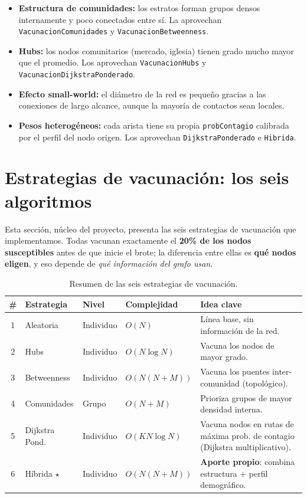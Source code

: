 \documentclass[spanish,notitlepage,letterpaper, 12pt]{article}
\begin{document}
\begin{itemize}[leftmargin=*]
    \item \textbf{Estructura de comunidades:} los estratos forman grupos densos internamente y poco conectados entre s\'i. La aprovechan \texttt{VacunacionComunidades} y \texttt{VacunacionBetweenness}.
    \item \textbf{Hubs:} los nodos comunitarios (mercado, iglesia) tienen grado mucho mayor que el promedio. Los aprovechan \texttt{VacunacionHubs} y \texttt{VacunacionDijkstraPonderado}.
    \item \textbf{Efecto small-world:} el di\'ametro de la red es peque\~no gracias a las conexiones de largo alcance, aunque la mayor\'ia de contactos sean locales.
    \item \textbf{Pesos heterog\'eneos:} cada arista tiene su propia \texttt{probContagio} calibrada por el perfil del nodo origen. Los aprovechan \texttt{DijkstraPonderado} e \texttt{Hibrida}.
\end{itemize}

\newpage
\section{Estrategias de vacunaci\'on: los seis algoritmos}
\label{sec:estrategias}

Esta secci\'on, n\'ucleo del proyecto, presenta las seis estrategias de vacunaci\'on que implementamos. Todas vacunan exactamente el \textbf{20\% de los nodos susceptibles} antes de que inicie el brote; la diferencia entre ellas es \textbf{qu\'e nodos eligen}, y eso depende de \textit{qu\'e informaci\'on del grafo usan}.

\begin{table}[H]
\centering
\small
\caption{Resumen de las seis estrategias de vacunaci\'on.}
\label{tab:resumen_estrategias}
\begin{tabular}{c l l l p{5.5cm}}
\toprule
\textbf{\#} & \textbf{Estrategia} & \textbf{Nivel} & \textbf{Complejidad} & \textbf{Idea clave} \\
\midrule
1 & Aleatoria & Individuo & $O(N)$ & L\'inea base, sin informaci\'on de la red. \\
2 & Hubs & Individuo & $O(N \log N)$ & Vacuna los nodos de mayor grado. \\
3 & Betweenness & Individuo & $O(N(N+M))$ & Vacuna los puentes inter-comunidad (topol\'ogico). \\
4 & Comunidades & Grupo & $O(N+M)$ & Prioriza grupos de mayor densidad interna. \\
5 & Dijkstra Pond. & Individuo & $O(K N \log N)$ & Vacuna nodos en rutas de m\'axima prob. de contagio (Dijkstra multiplicativo). \\
6 & H\'ibrida $\star$ & Individuo & $O(N(N+M))$ & \textbf{Aporte propio}: combina estructura + perfil demogr\'afico. \\
\bottomrule
\end{tabular}
\end{table}
\end{document}
